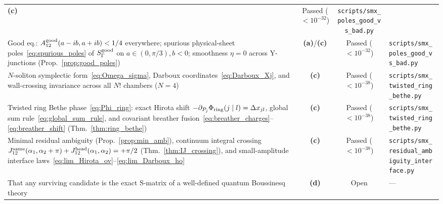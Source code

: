 \documentclass[11pt,a4paper]{article}
\newcommand{\La}{\textsf{\textbf{(a)}}}
\newcommand{\Lc}{\textsf{\textbf{(c)}}}
\newcommand{\Ld}{\textsf{\textbf{(d)}}}
\newcommand{\smxpoles}{\texttt{scripts/\allowbreak smx\_\allowbreak poles\_\allowbreak good\_\allowbreak vs\_\allowbreak bad.py}}
\newcommand{\smxring}{\texttt{scripts/\allowbreak smx\_\allowbreak twisted\_\allowbreak ring\_\allowbreak bethe.py}}
\newcommand{\smxamb}{\texttt{scripts/\allowbreak smx\_\allowbreak residual\_\allowbreak ambiguity\_\allowbreak interface.py}}
\theoremstyle{remark}
\begin{document}
\begin{table}[ht]
\begin{tabular}{@{}>{\raggedright\arraybackslash}p{7.1cm}cc>{\raggedright\arraybackslash}p{4.6cm}@{}}
\Lc & Passed ($<10^{-32}$) & \smxpoles \\
\addlinespace[3pt]
Good eq.: $A_{12}^{\rm good}(a-ib,a+ib)<1/4$ everywhere; spurious physical-sheet poles~\eqref{eq:spurious_poles} of $S_\Gamma^{\rm good}$ on $a\in(0,\pi/3),b<0$; smoothness $\eta=0$ across Y-junctions (Prop.~\ref{prop:good_poles}) &
\La/\Lc & Passed ($<10^{-32}$) & \smxpoles \\
\addlinespace[3pt]
$N$-soliton symplectic form~\eqref{eq:Omega_sigma}, Darboux coordinates~\eqref{eq:Darboux_Xj}, and wall-crossing invariance across all $N!$ chambers ($N=4$) &
\Lc & Passed ($<10^{-38}$) & \smxring \\
\addlinespace[3pt]
Twisted ring Bethe phase~\eqref{eq:Phi_ring}: exact Hirota shift $-\partial_{P_j}\Phi_{\rm ring}(j\mid l)=\Delta x_{jl}$, global sum rule~\eqref{eq:global_sum_rule}, and covariant breather fusion~\eqref{eq:breather_charges}--\eqref{eq:breather_shift} (Thm.~\ref{thm:ring_bethe}) &
\Lc & Passed ($<10^{-38}$) & \smxring \\
\addlinespace[3pt]
Minimal residual ambiguity (Prop.~\ref{prop:min_amb}), continuum integral crossing $J_{12}^{\rm same}(\alpha_1,\alpha_2+\pi)+J_{12}^{\rm head}(\alpha_1,\alpha_2)=+\pi/2$ (Thm.~\ref{thm:IJ_crossing}), and small-amplitude interface laws~\eqref{eq:lim_Hirota_ov}--\eqref{eq:lim_Darboux_ho} &
\Lc & Passed ($<10^{-38}$) & \smxamb \\
\addlinespace[3pt]
That any surviving candidate is the exact S-matrix of a well-defined quantum Boussinesq theory &
\Ld & Open & --- \\
\bottomrule
\end{tabular}
\end{table}
\end{document}
